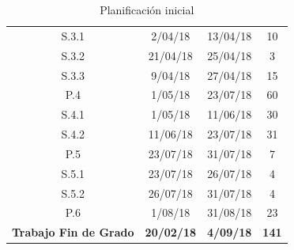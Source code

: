 \begin{table}[H]
\begin{tabular}{cccc}
\rowcolor[HTML]{FFFC9E} 
{\color[HTML]{333333} S.3.1}                                    & {\color[HTML]{333333} 2/04/18}           & {\color[HTML]{333333} 13/04/18}         & {\color[HTML]{333333} 10}               \\
\rowcolor[HTML]{FFFC9E} 
{\color[HTML]{333333} S.3.2}                                    & {\color[HTML]{333333} 21/04/18}          & {\color[HTML]{333333} 25/04/18}         & {\color[HTML]{333333} 3}                \\
\rowcolor[HTML]{FFFC9E} 
{\color[HTML]{333333} S.3.3}                                    & {\color[HTML]{333333} 9/04/18}           & {\color[HTML]{333333} 27/04/18}         & {\color[HTML]{333333} 15}               \\
\rowcolor[HTML]{67FD9A} 
P.4                                                             & 1/05/18                                  & 23/07/18                                & 60                                      \\
\rowcolor[HTML]{9AFF99} 
S.4.1                                                           & 1/05/18                                  & 11/06/18                                & 30                                      \\
\rowcolor[HTML]{9AFF99} 
S.4.2                                                           & 11/06/18                                 & 23/07/18                                & 31                                      \\
\rowcolor[HTML]{38FFF8} 
P.5                                                             & 23/07/18                                 & 31/07/18                                & 7                                       \\
\rowcolor[HTML]{96FFFB} 
S.5.1                                                           & 23/07/18                                 & 26/07/18                                & 4                                       \\
\rowcolor[HTML]{96FFFB} 
S.5.2                                                           & 26/07/18                                 & 31/07/18                                & 4                                       \\
\rowcolor[HTML]{96FFFB} 
P.6                                                             & 1/08/18                                  & 31/08/18                                & 23                                      \\
\rowcolor[HTML]{000000} 
{\color[HTML]{FFFFFF} \textbf{Trabajo Fin de Grado}}            & {\color[HTML]{FFFFFF} \textbf{20/02/18}} & {\color[HTML]{FFFFFF} \textbf{4/09/18}} & {\color[HTML]{FFFFFF} \textbf{141}}    
\end{tabular}
\caption{Planificación inicial}
\label{tab:plan1}
\end{table}

